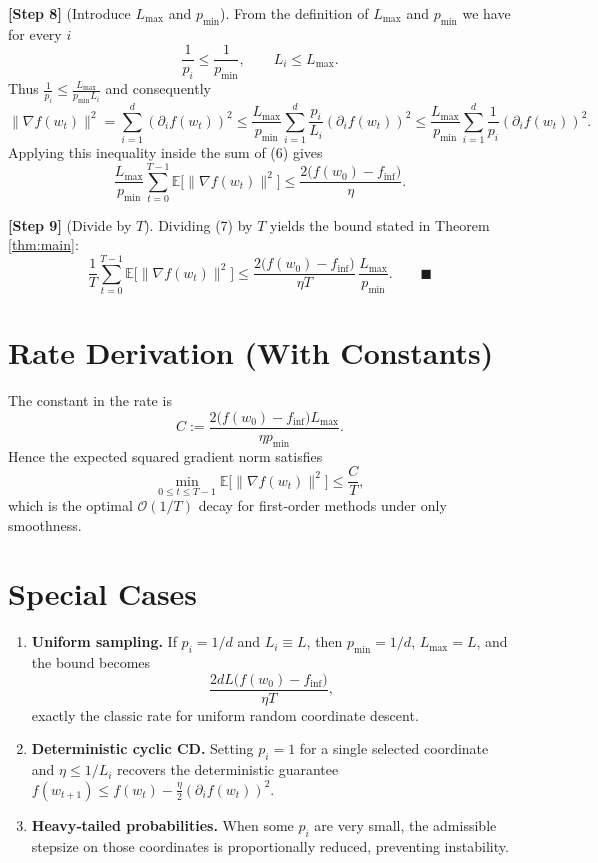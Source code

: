 \documentclass{article}
\newcommand{\E}{\mathbb{E}}
\begin{document}
\noindent\textbf{[Step 8]} (Introduce $L_{\max}$ and $p_{\min}$).  
From the definition of $L_{\max}$ and $p_{\min}$ we have for every $i$
\[
\frac{1}{p_i}\le\frac{1}{p_{\min}},\qquad
L_i\le L_{\max}.
\]
Thus $\frac{1}{p_i}\le\frac{L_{\max}}{p_{\min}L_i}$ and consequently
\[
\|\nabla f(w_t)\|^{2}
   =\sum_{i=1}^{d}(\partial_i f(w_t))^{2}
   \le \frac{L_{\max}}{p_{\min}}
        \sum_{i=1}^{d}\frac{p_i}{L_i}(\partial_i f(w_t))^{2}
   \le \frac{L_{\max}}{p_{\min}}
        \sum_{i=1}^{d}\frac{1}{p_i}(\partial_i f(w_t))^{2}.
\]
Applying this inequality inside the sum of (6) gives
\[
\frac{L_{\max}}{p_{\min}}
   \sum_{t=0}^{T-1}
        \E\!\bigl[\|\nabla f(w_t)\|^{2}\bigr]
   \le \frac{2\bigl(f(w_0)-f_{\inf}\bigr)}{\eta}.
\tag{7}
\]

\noindent\textbf{[Step 9]} (Divide by $T$).  
Dividing (7) by $T$ yields the bound stated in Theorem \ref{thm:main}:
\[
\frac{1}{T}\sum_{t=0}^{T-1}\E\!\bigl[\|\nabla f(w_t)\|^{2}\bigr]
   \le \frac{2\bigl(f(w_0)-f_{\inf}\bigr)}{\eta T}\,
      \frac{L_{\max}}{p_{\min}} .
\qquad\blacksquare
\]

\section*{Rate Derivation (With Constants)}
The constant in the rate is 
\[
C:=\frac{2\bigl(f(w_0)-f_{\inf}\bigr)L_{\max}}{\eta p_{\min}} .
\]
Hence the expected squared gradient norm satisfies
\[
\min_{0\le t\le T-1}\E\!\bigl[\|\nabla f(w_t)\|^{2}\bigr]
   \le \frac{C}{T},
\]
which is the optimal $\mathcal O(1/T)$ decay for first‑order methods under only smoothness.

\section*{Special Cases}
\begin{enumerate}[label=(\alph*)]
\item \textbf{Uniform sampling.} If $p_i=1/d$ and $L_i\equiv L$, then $p_{\min}=1/d$,
$L_{\max}=L$, and the bound becomes
\[
\frac{2dL\bigl(f(w_0)-f_{\inf}\bigr)}{\eta T},
\]
exactly the classic rate for uniform random coordinate descent.
\item \textbf{Deterministic cyclic CD.} Setting $p_i=1$ for a single selected coordinate
and $\eta\le 1/L_i$ recovers the deterministic guarantee
$f(w_{t+1})\le f(w_t)-\frac{\eta}{2}(\partial_i f(w_t))^{2}$.
\item \textbf{Heavy‑tailed probabilities.} When some $p_i$ are very small, the admissible
stepsize on those coordinates is proportionally reduced, preventing instability.
\end{enumerate}
\end{document}
